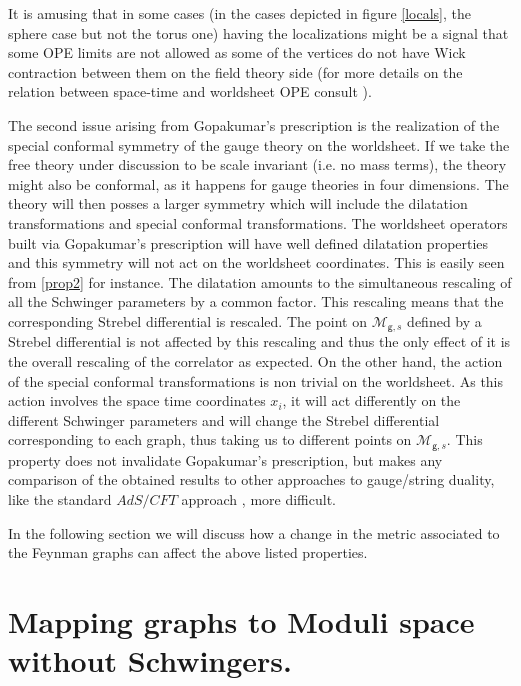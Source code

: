 \documentclass[11pt]{JHEP3}
\def\gg{\mathsf g }
\begin{document}
 It is amusing that in some cases (in the cases
depicted in figure \ref{locals}, the sphere case but not the torus one) having the localizations
might be a signal that some OPE limits are not allowed as some of the vertices do not have
Wick contraction between them on the field theory side \cite{Aharony:2007fs} (for more details on
the relation between space-time and worldsheet OPE consult \cite{Aharony:2007rq}).
 
\medskip
The second issue arising from Gopakumar's prescription is the realization
of the special conformal symmetry of the gauge theory on the worldsheet. If we take the
free theory under discussion to be scale invariant (i.e. no mass terms), the theory might
also be conformal, as it happens for gauge theories in four dimensions. The theory 
will then posses a larger symmetry which will include the dilatation transformations
and special conformal transformations. The worldsheet operators built via Gopakumar's 
prescription will have well defined dilatation properties and this symmetry will not act
on the worldsheet coordinates. This is easily seen from \eqref{prop2} for instance. The dilatation
amounts to the simultaneous rescaling of all the Schwinger parameters by a common factor. This
rescaling means that the corresponding Strebel differential is rescaled. The point on 
 ${\mathcal M}_{\gg,s}$  defined by a Strebel differential is not affected by this rescaling
and thus the only effect of it is the overall rescaling of the correlator as expected.
On the other hand, the action of the special conformal transformations is non trivial
on the worldsheet. As this action involves the space time coordinates $x_i$, it
will act differently on the different Schwinger parameters and will change the Strebel
differential corresponding to each graph, thus taking us to different points on
${\mathcal M}_{\gg,s}$. This property  does not invalidate Gopakumar's prescription, 
but makes any comparison of the obtained results to other approaches to gauge/string duality, 
like the standard $AdS/CFT$ approach \cite{Maldacena:1997re},  more difficult.

\medskip 
In the following section we will discuss how a change in the metric associated
to the Feynman graphs can affect the above listed properties.

\section{Mapping graphs to Moduli space without Schwingers.}\label{presc}
\end{document}
